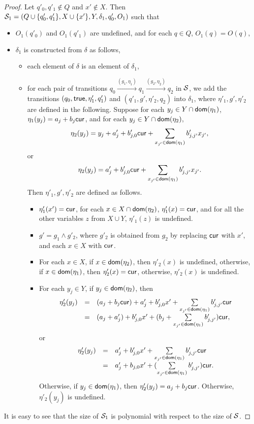\begin{appendix}
\begin{proof}
Let $q'_{0},q'_{1} \not \in Q$ and $x' \not \in X$. Then ${\mathcal{S} }_1 = (Q \cup \{q'_{0},q'_1\}, X \cup \{x'\}, Y, \delta_1, q'_{0}, O_1)$ such that 
\begin{itemize}
\item $O_1(q'_0)$ and $O_1(q'_1)$ are undefined, and for each $q \in Q$, $O_1(q)=O(q)$,
%
\item $\delta_1$ is constructed from $\delta$ as follows,
\begin{itemize}
\item each element of $\delta$ is an element of $\delta_1$,
%
\item for each pair of transitions $q_0 \xrightarrow{(g_1,\eta_1)} q_1 \xrightarrow{(g_2,\eta_2)} q_2$ in ${\mathcal{S} }$, we add the transitions $(q_0, \mathsf{true}, \eta'_1, q'_1)$ and $(q'_1, g', \eta'_2, q_2)$ into $\delta_1$, where $\eta'_1,g',\eta'_2$ are defined in the following. Suppose for each $y_j \in Y \cap \mathsf{dom}(\eta_1)$, $\eta_1(y_j)=a_{j} + b_{j}\mathsf{cur}$, and for each $y_j \in Y \cap \mathsf{dom}(\eta_2)$, 
\[\eta_2(y_j)= y_j + a'_{j} + b'_{j,0}  \mathsf{cur} + \sum\limits_{x_{j'} \in \mathsf{dom}(\eta_1)} b'_{j,j'} x_{j'},\] 
or 
\[
\eta_2(y_j) = a'_{j} + b'_{j,0} \mathsf{cur} + \sum \limits_{x_{j'} \in \mathsf{dom}(\eta_1)} b'_{j,j'} x_{j'} .
\]
Then $\eta'_1, g', \eta'_2$ are defined as follows.
\begin{itemize}
\item $\eta'_1(x')=\mathsf{cur}$, for each $x \in X \cap \mathsf{dom}(\eta_2)$, $\eta'_1(x)=\mathsf{cur}$, and for all the other variables $z$ from $X \cup Y$, $\eta'_1(z)$ is undefined.
%
\item $g' = g_1 \wedge g'_2$, where $g'_2$ is obtained from $g_2$ by replacing $\mathsf{cur}$ with $x'$, and each $x \in X$ with $\mathsf{cur}$.
%
\item For each $x \in X$, if $x \in \mathsf{dom}(\eta_2)$, then $\eta'_2(x)$ is undefined, otherwise, if $x \in \mathsf{dom}(\eta_1)$, then $\eta'_2(x)=\mathsf{cur}$, otherwise, $\eta'_2(x)$ is undefined.
%
\item For each $y_j \in Y$, if $y_j \in \mathsf{dom}(\eta_2)$, then 
\[
\begin{array}{l c l}
\eta'_2(y_j) & = & (a_{j} + b_{j}\mathsf{cur}) + a'_{j} + b'_{j,0} x' + \sum \limits_{x_{j'} \in \mathsf{dom}(\eta_1)} b'_{j,j'} \mathsf{cur} \\
& = & (a_{j} + a'_{j}) + b'_{j,0} x' + (b_{j}  + \sum \limits_{x_{j'} \in \mathsf{dom}(\eta_1)} b'_{j,j'} )\mathsf{cur},
\end{array}
\]
or 
\[
\begin{array}{l c l}
\eta'_2(y_j) & = & a'_{j} + b'_{j,0} x' + \sum \limits_{x_{j'} \in \mathsf{dom}(\eta_1)} b'_{j,j'} \mathsf{cur}  \\
& = & a'_{j} + b_{j,0} x' + (\sum \limits_{x_{j'} \in \mathsf{dom}(\eta_1)} b'_{j,j'}  )\mathsf{cur}.
\end{array}
\]
%
Otherwise, if $y_j \in \mathsf{dom}(\eta_1)$, then $\eta'_2(y_j)= a_{j} + b_{j} \mathsf{cur}$. Otherwise, $\eta'_2(y_j)$ is undefined.
\end{itemize}
\end{itemize}
\end{itemize}
It is easy to see that the size of ${\mathcal{S} }_1$ is polynomial with respect to the size of ${\mathcal{S} }$.


\end{proof}
\end{appendix}
